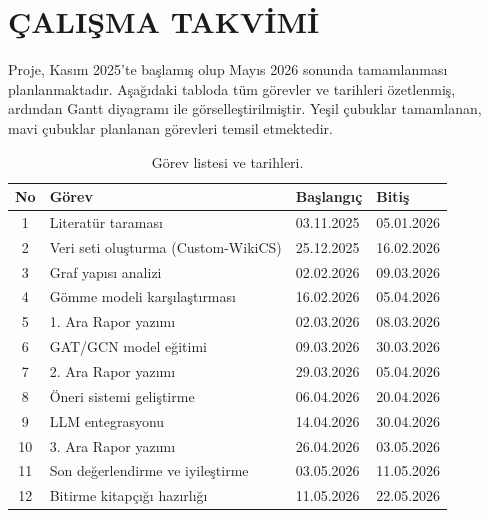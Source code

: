 \chapter{ÇALIŞMA TAKVİMİ}
\thispagestyle{empty}

Proje, Kasım 2025'te başlamış olup Mayıs 2026 sonunda tamamlanması planlanmaktadır. Aşağıdaki tabloda tüm görevler ve tarihleri özetlenmiş, ardından Gantt diyagramı ile görselleştirilmiştir. Yeşil çubuklar tamamlanan, mavi çubuklar planlanan görevleri temsil etmektedir.

\begin{table}[htbp]
\centering
\caption{Görev listesi ve tarihleri.}
\label{tab:gorevler}
\begin{tabular}{clll}
\toprule
\textbf{No} & \textbf{Görev} & \textbf{Başlangıç} & \textbf{Bitiş} \\
\midrule
1  & Literatür taraması                   & 03.11.2025 & 05.01.2026 \\
2  & Veri seti oluşturma (Custom-WikiCS)  & 25.12.2025 & 16.02.2026 \\
3  & Graf yapısı analizi                  & 02.02.2026 & 09.03.2026 \\
4  & Gömme modeli karşılaştırması         & 16.02.2026 & 05.04.2026 \\
5  & 1. Ara Rapor yazımı                  & 02.03.2026 & 08.03.2026 \\
\midrule
6  & GAT/GCN model eğitimi               & 09.03.2026 & 30.03.2026 \\
7  & 2. Ara Rapor yazımı                  & 29.03.2026 & 05.04.2026 \\
8  & Öneri sistemi geliştirme             & 06.04.2026 & 20.04.2026 \\
9  & LLM entegrasyonu                     & 14.04.2026 & 30.04.2026 \\
10 & 3. Ara Rapor yazımı                  & 26.04.2026 & 03.05.2026 \\
11 & Son değerlendirme ve iyileştirme     & 03.05.2026 & 11.05.2026 \\
12 & Bitirme kitapçığı hazırlığı          & 11.05.2026 & 22.05.2026 \\
\bottomrule
\end{tabular}
\end{table}

